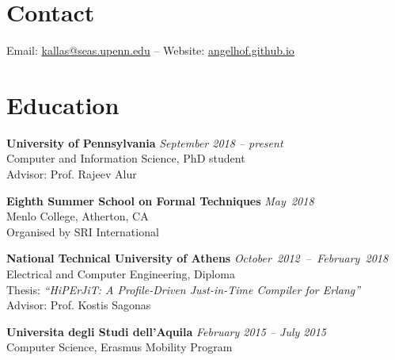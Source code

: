 \documentclass[margin]{res}
\begin{document}
\begin{resume}

\section{Contact} 
Email: \href{mailto:kallas@seas.upenn.edu}{kallas@seas.upenn.edu} -- Website: \href{https://angelhof.github.io/}{angelhof.github.io}


\section{Education}
\textbf{University of Pennsylvania} \hfill {\em September 2018 -- present}\\
Computer and Information Science, PhD student \\
Advisor: Prof. Rajeev Alur

\textbf{Eighth Summer School on Formal Techniques} \hfill \mbox{\em May 2018}\\
Menlo College, Atherton, CA \\
Organised by SRI International

\textbf{National Technical University of Athens} \hfill \mbox{\em October 2012 -- February 2018}\\
Electrical and Computer Engineering, Diploma \\ %
Thesis: \textit{``HiPErJiT: A Profile-Driven Just-in-Time Compiler for Erlang''} \\
Advisor: Prof. Kostis Sagonas 

\textbf{Universita degli Studi dell'Aquila} \hfill {\em February 2015 -- July 2015} \\
Computer Science, Erasmus Mobility Program %





\end{resume}
\end{document}

